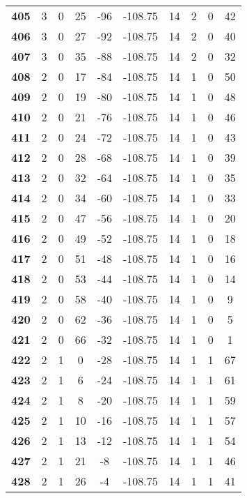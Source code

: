 \documentclass{article}%
\begin{document}
\begin{longtable}{cccccccccc}
        \textbf{405} & 3 & 0 & 25 & -96 & -108.75 & 14 & 2 & 0 & 42 \\ 
        \textbf{406} & 3 & 0 & 27 & -92 & -108.75 & 14 & 2 & 0 & 40 \\ 
        \textbf{407} & 3 & 0 & 35 & -88 & -108.75 & 14 & 2 & 0 & 32 \\ 
        \textbf{408} & 2 & 0 & 17 & -84 & -108.75 & 14 & 1 & 0 & 50 \\ 
        \textbf{409} & 2 & 0 & 19 & -80 & -108.75 & 14 & 1 & 0 & 48 \\ 
        \textbf{410} & 2 & 0 & 21 & -76 & -108.75 & 14 & 1 & 0 & 46 \\ 
        \textbf{411} & 2 & 0 & 24 & -72 & -108.75 & 14 & 1 & 0 & 43 \\ 
        \textbf{412} & 2 & 0 & 28 & -68 & -108.75 & 14 & 1 & 0 & 39 \\ 
        \textbf{413} & 2 & 0 & 32 & -64 & -108.75 & 14 & 1 & 0 & 35 \\ 
        \textbf{414} & 2 & 0 & 34 & -60 & -108.75 & 14 & 1 & 0 & 33 \\ 
        \textbf{415} & 2 & 0 & 47 & -56 & -108.75 & 14 & 1 & 0 & 20 \\ 
        \textbf{416} & 2 & 0 & 49 & -52 & -108.75 & 14 & 1 & 0 & 18 \\ 
        \textbf{417} & 2 & 0 & 51 & -48 & -108.75 & 14 & 1 & 0 & 16 \\ 
        \textbf{418} & 2 & 0 & 53 & -44 & -108.75 & 14 & 1 & 0 & 14 \\ 
        \textbf{419} & 2 & 0 & 58 & -40 & -108.75 & 14 & 1 & 0 & 9 \\ 
        \textbf{420} & 2 & 0 & 62 & -36 & -108.75 & 14 & 1 & 0 & 5 \\ 
        \textbf{421} & 2 & 0 & 66 & -32 & -108.75 & 14 & 1 & 0 & 1 \\ 
        \textbf{422} & 2 & 1 & 0 & -28 & -108.75 & 14 & 1 & 1 & 67 \\ 
        \textbf{423} & 2 & 1 & 6 & -24 & -108.75 & 14 & 1 & 1 & 61 \\ 
        \textbf{424} & 2 & 1 & 8 & -20 & -108.75 & 14 & 1 & 1 & 59 \\ 
        \textbf{425} & 2 & 1 & 10 & -16 & -108.75 & 14 & 1 & 1 & 57 \\ 
        \textbf{426} & 2 & 1 & 13 & -12 & -108.75 & 14 & 1 & 1 & 54 \\ 
        \textbf{427} & 2 & 1 & 21 & -8 & -108.75 & 14 & 1 & 1 & 46 \\ 
        \textbf{428} & 2 & 1 & 26 & -4 & -108.75 & 14 & 1 & 1 & 41 \\ 

\end{longtable}
\end{document}
